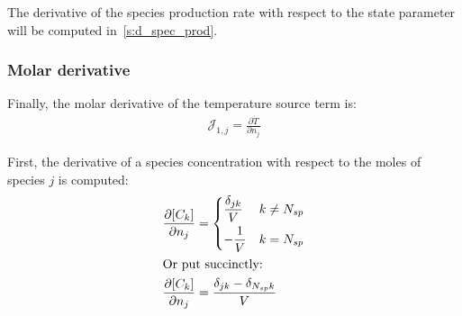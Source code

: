 \documentclass[12pt,number,sort&compress]{elsarticle}
\newcommand{\ns}{N_{sp}}
\begin{document}
The derivative of the species production rate with respect to the state parameter will be computed in~\cref{s:d_spec_prod}.

\subsubsection{Molar derivative}
Finally, the molar derivative of the temperature source term is:
\begin{align}
 \mathcal{J}_{1,j} = \frac{\partial\dot{T}}{\partial{n_j}}
\end{align}

First, the derivative of a species concentration with respect to the moles of species $j$ is computed:
\begin{align}
 \frac{\partial [C_k]}{\partial n_j} &=
 \begin{dcases}
 \frac{\delta_{j k}}{V} & k \ne \ns \\
 -\frac{1}{V} & k = \ns
 \end{dcases} \\
\intertext{Or put succinctly:}
\label{e:dck_dnj}
\frac{\partial [C_k]}{\partial n_j} &= \frac{\delta_{j k} - \delta_{\ns k}}{V}
\end{align}
\end{document}
